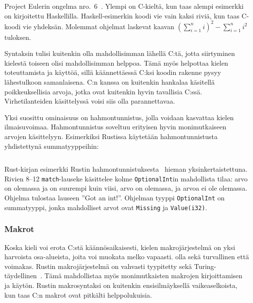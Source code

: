 \begin{listing}[ht!]
    \inputminted{C}{squaresum.c}
    \inputminted{Haskell}{squaresum.hs}
    \caption{Project Eulerin ongelma nro.\ 6~\citep{euler}. Ylempi on
    C-kieltä, kun taas alempi esimerkki on kirjoitettu Haskellilla.
    Haskell-esimerkin koodi vie vain kaksi riviä, kun taas C-koodi vie
    yhdeksän. Molemmat ohjelmat laskevat kaavan
    $(\sum\limits_{i=1}^n i)^2 - \sum\limits_{i=1}^n i^2$ tuloksen.
    }
    \label{fig:strcmp}
\end{listing}

\FloatBarrier

Syntaksin tulisi kuitenkin olla mahdollisimman lähellä C:tä, jotta siirtyminen
kielestä toiseen olisi mahdollisimman helppoa. Tämä myös helpottaa kielen
toteuttamista ja käyttöä, sillä käännettäessä C:ksi koodin rakenne pysyy
lähestulkoon samanlaisena. C:n kanssa on kuitenkin hankalaa käsitellä
poikkeuksellisia arvoja, jotka ovat kuitenkin hyvin tavallisia C:ssä.
Virhetilanteiden käsittelyssä voisi siis olla parannettavaa.

\newpage
Yksi suosittu ominaisuus on hahmontunnistus, jolla
voidaan kasvattaa kielen ilmaisuvoimaa. Hahmontunnistus soveltuu erityisen
hyvin monimutkaiseen arvojen käsittelyyn. Esimerkiksi Rustissa käytetään
hahmontunnistusta yhdistettynä summatyyppeihin:

\FloatBarrier

\begin{listing}[ht!]
    \inputminted{Rust}{guards.rs}
    \caption{Rust-kirjan esimerkki Rustin
    hahmontunnistuksesta~\citep{rustguards} hieman yksinkertaistettuna. Rivien
    8--12 \texttt{match}-lauseke käsittelee kolme \texttt{OptionalInt}in
    mahdollista tilaa: arvo on olemassa ja on suurempi kuin viisi, arvo on
    olemassa, ja arvoa ei ole olemassa. Ohjelma tulostaa lauseen ''Got an
    int!''. Ohjelman tyyppi \texttt{OptionalInt} on summatyyppi, jonka
    mahdolliset arvot ovat \texttt{Missing} ja \texttt{Value(i32)}.}
    \label{fig:guards}
\end{listing}

\FloatBarrier

\subsubsection{Makrot}

Koska kieli voi erota C:stä käännösaikaisesti, kielen makrojärjestelmä on yksi
harvoista osa-alueista, joita voi muokata melko vapaasti. olla sekä turvallinen
että voimakas. Rustin makrojärjestelmä on vahvasti tyypitetty sekä
Turing-täydellinen~\citep{rustmacros}. Tämä mahdollistaa myös monimutkaisten
makrojen kirjoittamisen ja käytön. Rustin makrosyntaksi on kuitenkin
ensisilmäyksellä vaikeaselkoista, kun taas C:n makrot ovat pitkälti
helppolukuisia.

